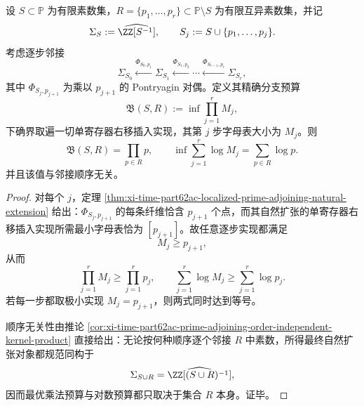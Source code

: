 \begin{theorem}[有限素数邻接的精确乘法预算律]\label{thm:conclusion-prime-adjunction-exact-multiplicative-budget}
设 \(S\subset \mathbb P\) 为有限素数集，\(R=\{p_1,\dots,p_r\}\subset \mathbb P\setminus S\) 为有限互异素数集，并记
\[
\Sigma_S:=\widehat{\ZZ[S^{-1}]},
\qquad
S_j:=S\cup\{p_1,\dots,p_j\}.
\]
考虑逐步邻接
\[
\Sigma_{S_0}\xleftarrow{\Phi_{S_0,p_1}}\Sigma_{S_1}\xleftarrow{\Phi_{S_1,p_2}}\cdots\xleftarrow{\Phi_{S_{r-1},p_r}}\Sigma_{S_r},
\]
其中 \(\Phi_{S_j,p_{j+1}}\) 为乘以 \(p_{j+1}\) 的 Pontryagin 对偶。定义其精确分支预算
\[
\mathfrak B(S,R):=\inf \prod_{j=1}^r M_j,
\]
下确界取遍一切单寄存器右移插入实现，其第 \(j\) 步字母表大小为 \(M_j\)。则
\[
\mathfrak B(S,R)=\prod_{p\in R}p,
\qquad
\inf\sum_{j=1}^r\log M_j=\sum_{p\in R}\log p.
\]
并且该值与邻接顺序无关。
\end{theorem}
\begin{proof}
对每个 \(j\)，定理 \ref{thm:xi-time-part62ac-localized-prime-adjoining-natural-extension} 给出：\(\Phi_{S_j,p_{j+1}}\) 的每条纤维恰含 \(p_{j+1}\) 个点，而其自然扩张的单寄存器右移插入实现所需最小字母表恰为 \([p_{j+1}]\)。故任意逐步实现都满足
\[
M_j\ge p_{j+1},
\]
从而
\[
\prod_{j=1}^r M_j\ge \prod_{j=1}^r p_j,
\qquad
\sum_{j=1}^r\log M_j\ge \sum_{j=1}^r\log p_j.
\]
若每一步都取极小实现 \(M_j=p_{j+1}\)，则两式同时达到等号。

顺序无关性由推论 \ref{cor:xi-time-part62ac-prime-adjoining-order-independent-kernel-product} 直接给出：无论按何种顺序逐个邻接 \(R\) 中素数，所得最终自然扩张对象都规范同构于
\[
\Sigma_{S\cup R}=\widehat{\ZZ[(S\cup R)^{-1}]},
\]
因而最优乘法预算与对数预算都只取决于集合 \(R\) 本身。证毕。
\end{proof}

